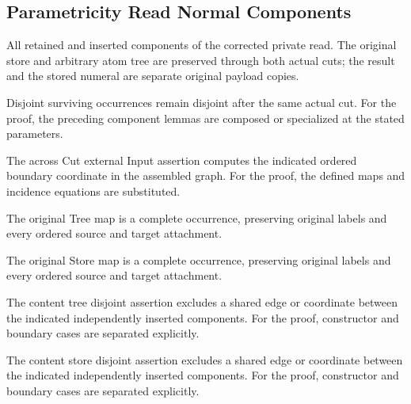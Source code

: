 \subsection{Parametricity Read Normal Components}
All retained and inserted components of the corrected private read. The original store and arbitrary atom tree are preserved through both actual cuts; the result and the stored numeral are separate original payload copies.

Disjoint surviving occurrences remain disjoint after the same actual cut.
For the proof, the preceding component lemmas are composed or specialized at the stated parameters.
\par{}

The across Cut external Input assertion computes the indicated ordered boundary coordinate in the assembled graph.
For the proof, the defined maps and incidence equations are substituted.
\par{}

The original Tree map is a complete occurrence, preserving original labels and every ordered source and target attachment.
\par{}

The original Store map is a complete occurrence, preserving original labels and every ordered source and target attachment.
\par{}

The content tree disjoint assertion excludes a shared edge or coordinate between the indicated independently inserted components.
For the proof, constructor and boundary cases are separated explicitly.
\par{}

The content store disjoint assertion excludes a shared edge or coordinate between the indicated independently inserted components.
For the proof, constructor and boundary cases are separated explicitly.
\par{}

